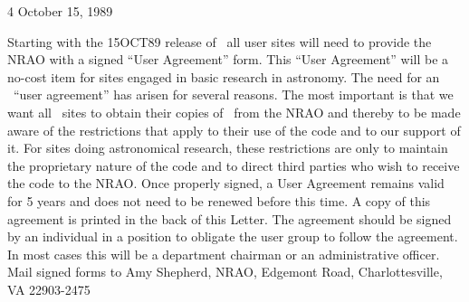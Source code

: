 

 {4} {October 15, 1989}




   Starting with the 15OCT89 release of \AIPS\ all user sites will
need to provide the NRAO with a signed ``User Agreement'' form.  This
``User Agreement'' will be a no-cost item for sites engaged in basic
research in astronomy.  The need for an \AIPS\ ``user agreement'' has
arisen for several reasons.  The most important is that we want all
\AIPS\ sites to obtain their copies of \AIPS\ from the NRAO and
thereby to be made aware of the restrictions that apply to their use
of the code and to our support of it.  For sites doing astronomical
research, these restrictions are only to maintain the proprietary
nature of the code and to direct third parties who wish to receive the
code to the \hbox{NRAO}.  Once properly signed, a User Agreement
remains valid for 5 years and does not need to be renewed before this
time.  A copy of this agreement is printed in the back of this
\AIPS Letter.  The agreement should be signed by an individual in a
position to obligate the user group to follow the agreement.  In most
cases this will be a department chairman or an administrative officer.
Mail signed forms to Amy Shepherd, NRAO, Edgemont Road,
Charlottesville, VA 22903-2475

